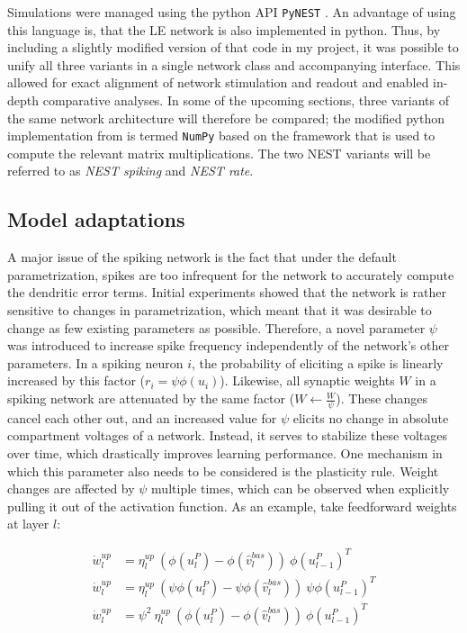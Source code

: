 Simulations were managed using the python API \texttt{PyNEST} \citep{Eppler2009}. An advantage of using this language
is, that the LE network  is also implemented in python. Thus, by including a slightly modified version of that code in
my project, it was possible to unify all three variants in a single network class and accompanying interface. This
allowed for exact alignment of network stimulation and readout and enabled in-depth comparative analyses. In some of the
upcoming sections, three variants of the same network architecture will therefore be compared; the modified python
implementation from \citep{Haider2021} is termed \texttt{NumPy} based on the framework that is used to compute the
relevant matrix multiplications. The two NEST variants will be referred to as
\textit{NEST spiking} and \textit{NEST rate}.

\subsection{Model adaptations}

A major issue of the spiking network is the fact that under the default parametrization, spikes are too infrequent for
the network to accurately compute the dendritic error terms. Initial experiments showed that the network is rather
sensitive to changes in parametrization, which meant that it was desirable to change as few existing parameters as
possible. Therefore, a novel parameter $\psi$ was introduced to increase spike frequency independently of the
network's other parameters. In a spiking neuron $i$, the probability of eliciting a spike is linearly increased by this
factor ($r_i = \psi \phi(u_i)$). Likewise, all synaptic weights $W$ in a spiking network are attenuated by the same
factor ($W \leftarrow \frac{W}{\psi}$). These changes cancel each other out, and an increased value for $\psi$ elicits
no change in absolute compartment voltages of a network. Instead, it serves to stabilize these voltages over time, which
drastically improves learning performance. One mechanism in which this parameter also needs to be considered is the
plasticity rule. Weight changes are affected by $\psi$ multiple times, which can be observed when explicitly pulling it
out of the activation function. As an example, take feedforward weights at layer $l$:

\begin{align*}
  \dot{w}_{l}^{up}   & = \eta_l^{up} \ ( \phi(u_l^{P}) - \phi(\hat{v}_l^{bas}) ) \ \phi(u_{l-1}^{P})^T\\
  \dot{w}_{l}^{up}   & = \eta_l^{up} \ ( \psi\phi(u_l^{P}) - \psi\phi(\hat{v}_l^{bas}) ) \ \psi\phi(u_{l-1}^{P})^T\\
  \dot{w}_{l}^{up}   & = \psi^2 \ \eta_l^{up} \ (\phi(u_l^{P}) - \phi(\hat{v}_l^{bas}) ) \ \phi(u_{l-1}^{P})^T
\end{align*}


